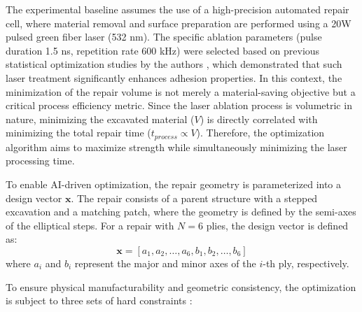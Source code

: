 \documentclass[
  preprint,
  12pt,
  a4paper
]{elsarticle}
\begin{document}
The experimental baseline assumes the use of a high-precision automated repair cell, where material removal and surface preparation are performed using a 20W pulsed green fiber laser (532 nm). The specific ablation parameters (pulse duration 1.5 ns, repetition rate 600 kHz) were selected based on previous statistical optimization studies by the authors \cite{psarras2020evaluating}, which demonstrated that such laser treatment significantly enhances adhesion properties. In this context, the minimization of the repair volume is not merely a material-saving objective but a critical process efficiency metric. Since the laser ablation process is volumetric in nature, minimizing the excavated material ($V$) is directly correlated with minimizing the total repair time ($t_{process} \propto V$). Therefore, the optimization algorithm aims to maximize strength while simultaneously minimizing the laser processing time.

To enable AI-driven optimization, the repair geometry is parameterized into a design vector $\mathbf{x}$. The repair consists of a parent structure with a stepped excavation and a matching patch, where the geometry is defined by the semi-axes of the elliptical steps. For a repair with $N=6$ plies, the design vector is defined as:
\begin{equation}
    \mathbf{x} = [a_1, a_2, \dots, a_6, b_1, b_2, \dots, b_6]
\end{equation}
where $a_i$ and $b_i$ represent the major and minor axes of the $i$-th ply, respectively.

To ensure physical manufacturability and geometric consistency, the optimization is subject to three sets of hard constraints \cite{psarras2024design}:
\end{document}
